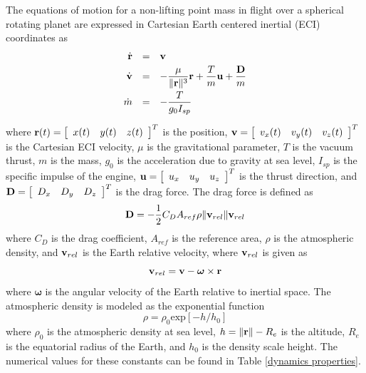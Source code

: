 \documentclass[10pt,final]{report}
\begin{document}
The equations of motion for a non-lifting point mass in flight over a
spherical rotating planet are expressed in Cartesian Earth centered inertial
(ECI) coordinates as
\begin{equation}\label{dyncs}
\begin{array}{rcl}
  \dot{\textbf{r}} &=& {\bf v} \vspace{3pt}\\
  \dot{\textbf{v}} &=& -\displaystyle\frac{\mu}{\|\textbf{r}\|^3}{\bf r} +
  \displaystyle\frac{T}{m}{\bf u} + \displaystyle\frac{{\bf D}}{m}  \vspace{3pt}\\
  \dot{m} & = & -\displaystyle\frac{T}{g_0I_{sp}}
\vspace{3pt}\\
\end{array}
\end{equation}
where ${\bf r}(t)=\left[\begin{array}{ccc} x(t) & y(t) & z(t)\end{array}\right]^T$
is the position, ${\bf v} = \left[\begin{array}{ccc} v_x(t) & v_y(t) & v_z(t)\end{array}\right]^T$
is the Cartesian ECI velocity, $\mu$ is the gravitational parameter, $T$ is
the vacuum thrust, $m$ is the mass, $g_0$ is the acceleration due to gravity at sea level,
$I_{sp}$ is the specific impulse of the engine,
${\bf u} = \left[\begin{array}{ccc} u_x & u_y & u_z \end{array}\right]^T$ is the thrust
direction, and ${\bf D}=\left[\begin{array}{ccc} D_x & D_y & D_z \end{array}\right]^T$
is the drag force.  The drag force is defined as
\begin{equation}
  {\bf D} = -\frac{1}{2}C_D A_{ref}\rho \|{\bf v}_{rel}\|{\bf v}_{rel}
\end{equation}
where $C_D$ is the drag coefficient, $A_{ref}$ is the reference area, $\rho$
is the atmospheric density, and ${\bf v}_{rel}$ is the Earth relative
velocity, where ${\bf v}_{rel}$ is given as
\begin{equation}
{\bf v}_{rel} = {\bf v}-\boldsymbol{\omega} \times {\bf r}
\end{equation}
where $\boldsymbol\omega$ is the angular velocity of the Earth relative to
inertial space.  The atmospheric density is modeled as the exponential
function
\begin{equation}
\rho = \rho_0\mbox{exp}[-h/h_0]
\end{equation}
where $\rho_0$ is the atmospheric density at sea level, $h=\|\mathbf{r}\|-R_e$ is
the altitude, $R_e$ is the equatorial radius of the Earth, and $h_0$ is the
density scale height.  The numerical values for these constants can be found
in Table \ref{dynamics properties}.
\end{document}
